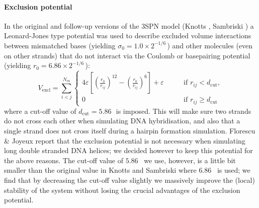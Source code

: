 \paragraph{Exclusion potential} In the original and follow-up versions of the 3SPN model (Knotts \etal \cite{knotts2007coarse}, Sambriski \etal \cite{sambriski2009mesoscale}) a Leonard-Jones type potential was used to describe excluded volume interactions between mismatched bases (yielding $\sigma_0 = 1.0 \times 2^{-1/6}$\,\Angstrom) and other molecules (even on other strands) that do not interact via the Coulomb or basepairing potential (yielding $r_0 = 6.86 \times 2^{-1/6}$\,\Angstrom):
\begin{equation}
V_\text{excl} =  \sum_{i<j}^{N_\text{ex}}\begin{cases} 4\varepsilon \left[ \left(\frac{r_{0}}{r_{ij}} \right)^{12} - \left(\frac{r_{0}}{r_{ij}} \right)^{6} \right] + \varepsilon \qquad &\text{if }r_{ij} < d_\text{cut}, \\ 0 \qquad &\text{if }r_{ij} \geq d_\text{cut} \end{cases} \end{equation}
where a cut-off value of $d_\text{cut} = 5.86$\,\Angstrom\ is imposed. This will make sure two strands do not cross each other when simulating DNA hybridisation, and also that a single strand does not cross itself during a hairpin formation simulation. Florescu \& Joyeux \cite{florescu2011thermal} report that the exclusion potential is not necessary when simulating long double stranded DNA helices; we decided however to keep this potential for the above reasons. The cut-off value of $5.86$ \Angstrom\ we use, however, is a little bit smaller than the original value in Knotts and Sambriski \cite{knotts2007coarse, sambriski2009mesoscale} where $6.86$ \Angstrom\ is used; we find that by decreasing the cut-off value slightly we massively improve the (local) stability of the system without losing the crucial advantages of the exclusion potential.

